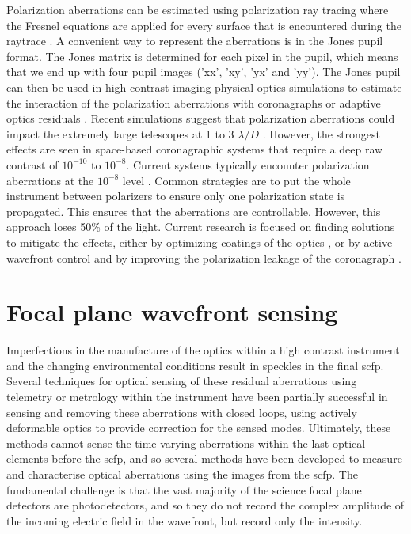 \documentclass[letterpaper]{ar-1col}
\newcommand{\ld}{$\lambda/D$}
\begin{document}
Polarization aberrations can be estimated using polarization ray tracing where the Fresnel equations are applied for every surface that is encountered during the raytrace \citep{ashcraft2023poke}. A convenient way to represent the aberrations is in the Jones pupil format. The Jones matrix is determined for each pixel in the pupil, which means that we end up with four pupil images ('xx', 'xy', 'yx' and 'yy'). The Jones pupil can then be used in high-contrast imaging physical optics simulations to estimate the interaction of the polarization aberrations with coronagraphs \citep{Anche23} or adaptive optics residuals \citep{millar2022polarization}. Recent simulations suggest that polarization aberrations could impact the extremely large telescopes at 1 to 3 \ld{} \citep{Anche23}. However, the strongest effects are seen in space-based coronagraphic systems that require a deep raw contrast of $10^{-10}$ to $10^{-8}$. Current systems typically encounter polarization aberrations at the $10^{-8}$ level \citep{mawet2011recent, seo2019testbed, baudoz2024polarization}. Common strategies are to put the whole instrument between polarizers to ensure only one polarization state is propagated. This ensures that the aberrations are controllable. However, this approach loses 50\% of the light. Current research is focused on finding solutions to mitigate the effects, either by optimizing coatings of the optics \citep{balasubramanian2005polarization,miller2022birefringent}, or by active wavefront control \citep{mendillo2021dual} and by improving the polarization leakage of the coronagraph \citep{Doelman20, Doelman23}.

\section{Focal plane wavefront sensing}

Imperfections in the manufacture of the optics within a high contrast instrument and the changing environmental conditions result in speckles in the final \ac{scfp}.
%
Several techniques for optical sensing of these residual aberrations using telemetry or metrology within the instrument have been partially successful in sensing and removing these aberrations with closed loops, using actively deformable optics to provide correction for the sensed modes.
%
Ultimately, these methods cannot sense the time-varying aberrations within the last optical elements before the \ac{scfp}, and so several methods have been developed to measure and characterise optical aberrations using the images from the \ac{scfp}.
%
The fundamental challenge is that the vast majority of the science focal plane detectors are photodetectors, and so they do not record the complex amplitude of the incoming electric field in the wavefront, but record only the intensity.
\end{document}
